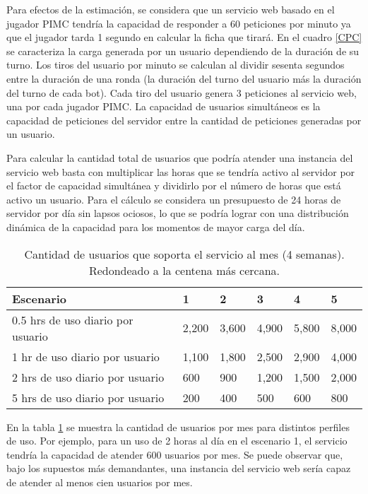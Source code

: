 Para efectos de la estimación, se considera que un servicio web basado en el
jugador PIMC tendría la capacidad de responder a 60 peticiones por minuto ya que
el jugador tarda 1 segundo en calcular la ficha que tirará. En el cuadro
\ref{CPC} se caracteriza la carga generada por un usuario dependiendo de la
duración de su turno. Los tiros del usuario por minuto se calculan al dividir
sesenta segundos entre la duración de una ronda (la duración del turno del
usuario más la duración del turno de cada bot). Cada tiro del usuario genera 3
peticiones al servicio web, una por cada jugador PIMC. La capacidad de usuarios
simultáneos es la capacidad de peticiones del servidor entre la cantidad de
peticiones generadas por un usuario.

Para calcular la cantidad total de usuarios que podría atender una instancia del
servicio web basta con multiplicar las horas que se tendría activo al servidor
por el factor de capacidad simultánea y dividirlo por el número de horas que
está activo un usuario. Para el cálculo se considera un presupuesto de 24 horas
de servidor por día sin lapsos ociosos, lo que se podría lograr con una
distribución dinámica de la capacidad para los momentos de mayor carga del día.

\begin{table}[!ht]
    \centering
    \caption{ Cantidad de usuarios que soporta el servicio al mes (4 semanas).
        Redondeado a la centena más cercana. }
    \begin{tabular}{|l|l|l|l|l|l|}
        \hline
        Escenario                         & 1     & 2     & 3     & 4     & 5     \\ \hline
        0.5 hrs de uso diario por usuario & 2,200 & 3,600 & 4,900 & 5,800 & 8,000 \\ \hline
        1 hr  de uso diario por usuario   & 1,100 & 1,800 & 2,500 & 2,900 & 4,000 \\ \hline
        2 hrs de uso diario por usuario   & 600   & 900   & 1,200 & 1,500 & 2,000 \\ \hline
        5 hrs de uso diario por usuario   & 200   & 400   & 500   & 600   & 800   \\ \hline
    \end{tabular}
    \label{CPCU}
\end{table}

En la tabla \ref{CPCU} se muestra la cantidad de usuarios por mes para distintos
perfiles de uso. Por ejemplo, para un uso de 2 horas al día en el escenario 1,
el servicio tendría la capacidad de atender 600 usuarios por mes. Se puede
observar que, bajo los supuestos más demandantes, una instancia del servicio web
sería capaz de atender al menos cien usuarios por mes.
